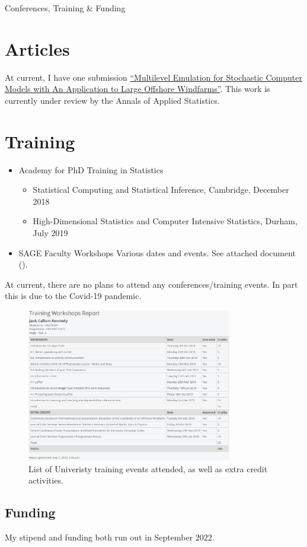 \begin{chapter}{Conferences, Training \& Funding\label{Ch:Training}}
\section{Articles}

At current, I have one submission \href{https://arxiv.org/abs/2003.08921}{``Multilevel Emulation for Stochastic Computer Models with An Application to Large Offshore Windfarms''}. This work is currently under review by the Annals of Applied Statistics.

\section{Training}

	\begin{itemize}
		\item Academy for PhD Training in Statistics
		\begin{itemize}
			\item Statistical Computing and Statistical Inference, Cambridge, December 2018
			\item High-Dimensional Statistics and Computer Intensive Statistics, Durham, July 2019
		\end{itemize}
		\item SAGE Faculty Workshops
		Various dates and events. See attached document ().
	\end{itemize}


At current, there are no plans to attend any conferences/training events. In part this is due to the Covid-19 pandemic.
	
\begin{figure}[h]
	\centering
	\includegraphics[width=0.8\textwidth]{fig/workshops.png}
	\caption{List of Univeristy training events attended, as well as extra credit activities.}
	\label{Fig:workshops}
\end{figure}
\subsection{Funding}

My stipend and funding both run out in September $2022$.

\end{chapter}
